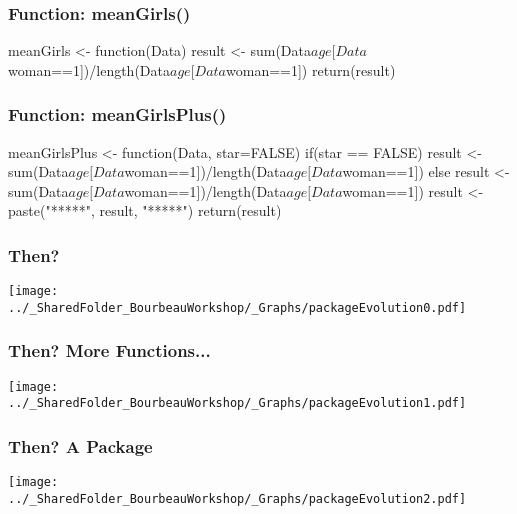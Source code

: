 \documentclass{beamer}
\begin{document}
    \begin{frame}[fragile=singleslide]
        \frametitle{\R Function: meanGirls()}
        \begin{code}
meanGirls <- function(Data){
    result <- sum(Data$age[Data$woman==1])/length(Data$age[Data$woman==1])
    return(result)
}
        \end{code}
    \end{frame}


    \begin{frame}[fragile=singleslide]
        \frametitle{\R Function: meanGirlsPlus()}
        \begin{code}
meanGirlsPlus <- function(Data, star=FALSE){
    if(star == FALSE){
        result <- sum(Data$age[Data$woman==1])/length(Data$age[Data$woman==1])
    } else {
        result <- sum(Data$age[Data$woman==1])/length(Data$age[Data$woman==1])
        result <- paste("*****", result, "*****")
    }    
    return(result)
}
        \end{code}
    \end{frame}
    
    \begin{frame}
        \frametitle{Then?} \vspace{1cm}
        \begin{center}
            \texttt{[image: ../\_SharedFolder\_BourbeauWorkshop/\_Graphs/packageEvolution0.pdf]}
        \end{center}
    \end{frame} 
    
    \begin{frame}
        \frametitle{Then? More \R Functions...} \vspace{1cm}
        \begin{center}
            \texttt{[image: ../\_SharedFolder\_BourbeauWorkshop/\_Graphs/packageEvolution1.pdf]}
        \end{center}
    \end{frame} 
    
    \begin{frame}
        \frametitle{Then? A \R Package} \vspace{1cm}
        \begin{center}
            \texttt{[image: ../\_SharedFolder\_BourbeauWorkshop/\_Graphs/packageEvolution2.pdf]}
        \end{center}
    \end{frame} 
    
\end{document}
